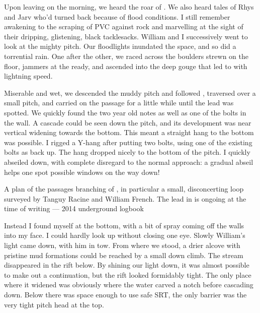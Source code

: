 
Upon leaving  on the morning, we heard the roar of . We also heard tales of Rhys and Jarv who'd turned back because of flood conditions. I still remember awakening to the scraping of PVC against rock and marvelling at  the sight of their dripping, glistening, black tacklesacks. William and I successively went to look at the mighty  pitch. Our floodlights inundated the space, and so did a torrential rain. One after the other, we raced across the boulders strewn on the floor, jammers at the ready, and ascended into the deep gouge that led to  with lightning speed.

Miserable and wet, we descended the muddy pitch and followed , traversed over a small pitch, and carried on the passage for a little while until the  lead was spotted. We quickly found the two year old notes as well as one of the bolts in the wall. A cascade could be seen down the pitch, and its development was near vertical widening towards the bottom. This meant a straight hang to the bottom was possible. I rigged a Y-hang after putting two bolts, using one of the existing bolts as back up. The hang dropped nicely to the bottom of the pitch. I quickly abseiled down, with complete disregard to the normal approach: a gradual abseil helps one spot possible windows on the way down! 

\begin{survey}[t]
	\checkoddpage \ifoddpage \forcerectofloat \else \forceversofloat \fi
    		\centering
    
   		\caption[A plan of the passages branching of \protect{}]{A plan of the passages branching of \protect{}, in particular a small, disconcerting loop surveyed by Tanguy Racine and William French. The lead in \protect{} is ongoing at the time of writing
    		 --- 2014 underground logbook}
		 \label{serrure scan}
\end{survey}

Instead I found myself at the bottom, with a bit of spray coming off the walls into my face. I could hardly look up without closing one eye. Slowly William's light came down, with him in tow. From where we stood, a drier alcove with pristine mud formations could be reached by a small down climb. The stream disappeared in the rift below. By shining our light down, it was almost possible to make out a continuation, but the rift looked formidably tight. The only place where it widened was obviously where the water carved a notch before cascading down. Below there was space enough to use safe SRT, the only barrier was the very tight pitch head at the top.


